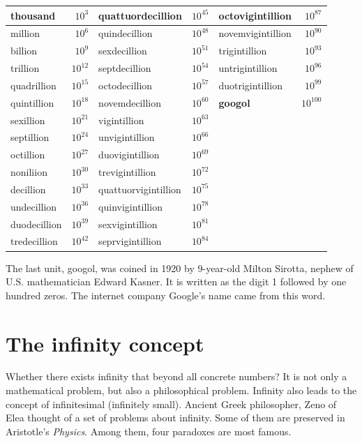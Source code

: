 \documentclass{article}
\begin{document}
\begin{center}
\begin{tabular}{|l|r|l|r|l|r|}
\hline
thousand & $10^{3}$ & quattuordecillion & $10^{45}$ & octovigintillion & $10^{87}$ \\
\hline
million & $10^{6}$ & quindecillion & $10^{48}$ & novemvigintillion & $10^{90}$ \\
\hline
billion & $10^{9}$ & sexdecillion & $10^{51}$ & trigintillion & $10^{93}$ \\
\hline
trillion  & $10^{12}$ & septdecillion & $10^{54}$ & untrigintillion & $10^{96}$ \\
\hline
quadrillion  & $10^{15}$ & octodecillion & $10^{57}$ & duotrigintillion & $10^{99}$ \\
\hline
quintillion  & $10^{18}$ & novemdecillion & $10^{60}$ & \textbf{googol} & $10^{100}$ \\
\hline
sexillion    & $10^{21}$ & vigintillion & $10^{63}$ & & \\
\hline
septillion   & $10^{24}$ & unvigintillion & $10^{66}$ & & \\
\hline
octillion    & $10^{27}$ & duovigintillion & $10^{69}$ & & \\
\hline
noniliion  & $10^{30}$ & trevigintillion & $10^{72}$ & & \\
\hline
decillion  & $10^{33}$ & quattuorvigintillion & $10^{75}$ & & \\
\hline
undecillion   & $10^{36}$ & quinvigintillion & $10^{78}$ & & \\
\hline
duodecillion  & $10^{39}$ & sexvigintillion & $10^{81}$ & & \\
\hline
tredecillion  & $10^{42}$ & seprvigintillion & $10^{84}$ & & \\
\hline
\end{tabular}
\end{center}

The last unit, googol, was coined in 1920 by 9-year-old Milton Sirotta, nephew of U.S. mathematician Edward Kasner. It is written as the digit 1 followed by one hundred zeros. The internet company Google's name came from this word\cite{Wikipedia-Googol}.

\section{The infinity concept}
 

Whether there exists infinity that beyond all concrete numbers? It is not only a mathematical problem, but also a philosophical problem. Infinity also leads to the concept of infinitesimal (infinitely small). Ancient Greek philosopher, Zeno of Elea thought of a set of problems about infinity. Some of them are preserved in Aristotle's {\em Physics}. Among them, four paradoxes are most famous.
\end{document}
